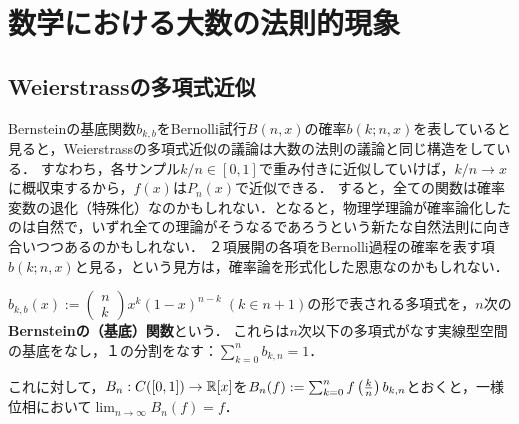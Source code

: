 \documentclass[uplatex,dvipdfmx]{jsreport}
\begin{document}
\section{数学における大数の法則的現象}

\subsection{Weierstrassの多項式近似}

\begin{tcolorbox}[colframe=ForestGreen, colback=ForestGreen!10!white,breakable,colbacktitle=ForestGreen!40!white,coltitle=black,fonttitle=\bfseries\sffamily,
title=]
    Bernsteinの基底関数$b_{k,b}$をBernolli試行$B(n,x)$の確率$b(k;n,x)$を表していると見ると，Weierstrassの多項式近似の議論は大数の法則の議論と同じ構造をしている．
    すなわち，各サンプル$k/n\in[0,1]$で重み付きに近似していけば，$k/n\to x$に概収束するから，$f(x)$は$P_n(x)$で近似できる．
    すると，全ての関数は確率変数の退化（特殊化）なのかもしれない．となると，物理学理論が確率論化したのは自然で，いずれ全ての理論がそうなるであろうという新たな自然法則に向き合いつつあるのかもしれない．
    ２項展開の各項をBernolli過程の確率を表す項$b(k;n,x)$と見る，という見方は，確率論を形式化した恩恵なのかもしれない．
\end{tcolorbox}

\begin{definition}
    $b_{k,b}(x):=\begin{pmatrix}n\\k\end{pmatrix}x^k(1-x)^{n-k}\;(k\in n+1)$の形で表される多項式を，$n$次の\textbf{Bernsteinの（基底）関数}という．
    これらは$n$次以下の多項式がなす実線型空間の基底をなし，１の分割をなす：$\sum^n_{k=0}b_{k,n}=1$．
\end{definition}

これに対して，$B_n:C([0,1])\to\mathbb{R}[x]$を$B_n(f):=\sum_{k=0}^nf\left(\frac{k}{n}\right)b_{k,n}$とおくと，一様位相において$\lim_{n\to\infty}B_n(f)=f$．
\end{document}
